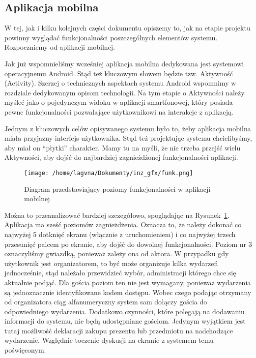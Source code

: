 \documentclass[10pt,titlepage]{article}
\begin{document}

\subsection{Aplikacja mobilna}
W tej, jak i kilku kolejnych części dokumentu opiszemy to, jak na etapie projektu powinny wyglądać funkcjonalności poszczególnych elementów systemu. Rozpoczniemy od aplikacji mobilnej.

Jak już wspomnieliśmy wcześniej aplikacja mobilna dedykowana jest systemowi operacyjnemu Android. Stąd też kluczowym słowem będzie tzw. Aktywność (Activity). Szerzej o technicznych aspektach
systemu Android wspomnimy w rozdziale dedykowanym opisom technologii. Na tym etapie o Aktywności należy myśleć jako o pojedynczym widoku w aplikacji smartfonowej, który posiada pewne funkcjonalności
pozwalające użytkownikowi na interakcje z aplikacją.

Jednym z kluczowych celów opisywanego systemu było to, żeby aplikacja mobilna miała przyjazny interfejs użytkownika. Stąd też projektując systemu chcielibyśmy, aby miał on ``płytki'' charakter.
Mamy tu na myśli, że nie trzeba przejść wielu Aktywności, aby dojść do najbardziej zagnieżdżonej funkcjonalności aplikacji.

\begin{figure}
\begin{center}
 \texttt{[image: /home/lagvna/Dokumenty/inz\_gfx/funk.png]}
 \caption{Diagram przedstawiający poziomy funkcjonalności w aplikacji mobilnej}
 \label{fig:funk}
\end{center}
\end{figure}

Można to przeanalizować bardziej szczegółowo, spoglądając na Rysunek~\ref{fig:funk}. Aplikacja ma sześć poziomów zagnieżdżenia. Oznacza to, że należy dokonać co najwyżej 5 dotknięć ekranu 
(włącznie z uruchomieniem) i co najwyżej trzech przesunięć palcem po ekranie, aby dojść do dowolnej funkcjonalności. Poziom nr 3 oznaczyliśmy gwiazdką, ponieważ zależy ona od aktora.
W przypadku gdy użytkownik jest organizatorem, to być może organizuje kilka wydarzeń jednocześnie, stąd należało przewidzieć wybór, administracji którego chce się aktualnie podjąć.
Dla gościa poziom ten nie jest wymagany, ponieważ wydarzenia są jednoznacznie identyfikowane kodem dostępu. Wobec czego podając otrzymany od organizatora ciąg alfanumeryczny system
sam dołączy gościa do odpowiedniego wydarzenia.
Dodatkowo czynności, które polegają na dodawaniu informacji do systemu, nie będą udostępniane gościom. Jedynym wyjątkiem jest tutaj możliwość deklaracji zakupu prezentu lub przedmiotu
na nadchodzące wydarzenie. Względnie toczenie dyskusji na ekranie z systemem temu poświęconym.
\end{document}
